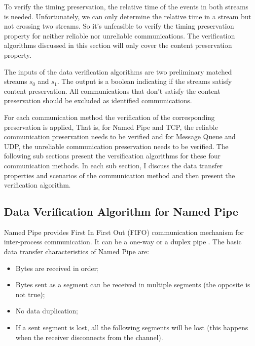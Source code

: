 To verify the timing preservation, the relative time of the events in both streams is needed. Unfortunately, we can only determine the relative time in a stream but not crossing two streams. So it's unfeasible to verify the timing preservation property for neither reliable nor unreliable communications. The verification algorithms discussed in this section will only cover the content preservation property.  

The inputs of the data verification algorithms are two preliminary matched streams $s_0$ and $s_1$. The output is a boolean indicating if the streams satisfy content preservation. All communications that don't satisfy the content preservation should be excluded as identified communications.

For each communication method the verification of the corresponding preservation is applied, That is, for Named Pipe and TCP, the reliable communication preservation needs to be verified and for Message Queue and UDP, the unreliable communication preservation needs to be verified. The following sub sections present the versification  algorithms for these four communication methods. In each sub section, I discuss the data transfer properties and scenarios of the communication method and then present the verification algorithm.

\subsection{Data Verification Algorithm for Named Pipe}
Named Pipe provides First In First Out (FIFO) communication mechanism for inter-process communication. It can be a one-way or a duplex pipe \cite{WinNamedpipe}. The basic data transfer characteristics of Named Pipe are: 
\begin{itemize}
  \item Bytes are received in order;
  \item Bytes sent as a segment can be received in multiple segments (the opposite is not true);
  \item No data duplication;
  \item If a sent segment is lost, all the following segments will be lost (this happens when the receiver disconnects from the channel).
  
\end{itemize}

